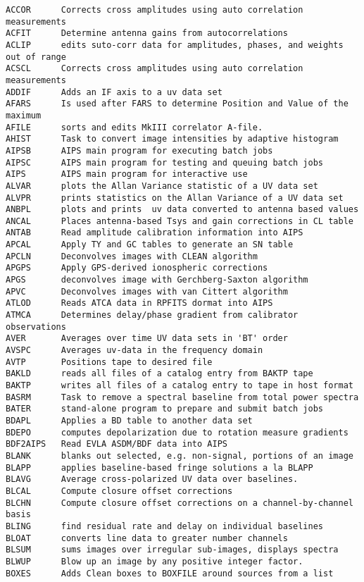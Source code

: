 \begin{verbatim}
ACCOR      Corrects cross amplitudes using auto correlation measurements
ACFIT      Determine antenna gains from autocorrelations
ACLIP      edits suto-corr data for amplitudes, phases, and weights out of range
ACSCL      Corrects cross amplitudes using auto correlation measurements
ADDIF      Adds an IF axis to a uv data set
AFARS      Is used after FARS to determine Position and Value of the maximum
AFILE      sorts and edits MkIII correlator A-file.
AHIST      Task to convert image intensities by adaptive histogram
AIPSB      AIPS main program for executing batch jobs
AIPSC      AIPS main program for testing and queuing batch jobs
AIPS       AIPS main program for interactive use
ALVAR      plots the Allan Variance statistic of a UV data set
ALVPR      prints statistics on the Allan Variance of a UV data set
ANBPL      plots and prints  uv data converted to antenna based values
ANCAL      Places antenna-based Tsys and gain corrections in CL table
ANTAB      Read amplitude calibration information into AIPS
APCAL      Apply TY and GC tables to generate an SN table
APCLN      Deconvolves images with CLEAN algorithm
APGPS      Apply GPS-derived ionospheric corrections
APGS       deconvolves image with Gerchberg-Saxton algorithm
APVC       Deconvolves images with van Cittert algorithm
ATLOD      Reads ATCA data in RPFITS dormat into AIPS
ATMCA      Determines delay/phase gradient from calibrator observations
AVER       Averages over time UV data sets in 'BT' order
AVSPC      Averages uv-data in the frequency domain
AVTP       Positions tape to desired file
BAKLD      reads all files of a catalog entry from BAKTP tape
BAKTP      writes all files of a catalog entry to tape in host format
BASRM      Task to remove a spectral baseline from total power spectra
BATER      stand-alone program to prepare and submit batch jobs
BDAPL      Applies a BD table to another data set
BDEPO      computes depolarization due to rotation measure gradients
BDF2AIPS   Read EVLA ASDM/BDF data into AIPS
BLANK      blanks out selected, e.g. non-signal, portions of an image
BLAPP      applies baseline-based fringe solutions a la BLAPP
BLAVG      Average cross-polarized UV data over baselines.
BLCAL      Compute closure offset corrections
BLCHN      Compute closure offset corrections on a channel-by-channel basis
BLING      find residual rate and delay on individual baselines
BLOAT      converts line data to greater number channels
BLSUM      sums images over irregular sub-images, displays spectra
BLWUP      Blow up an image by any positive integer factor.
BOXES      Adds Clean boxes to BOXFILE around sources from a list

\end{verbatim}
